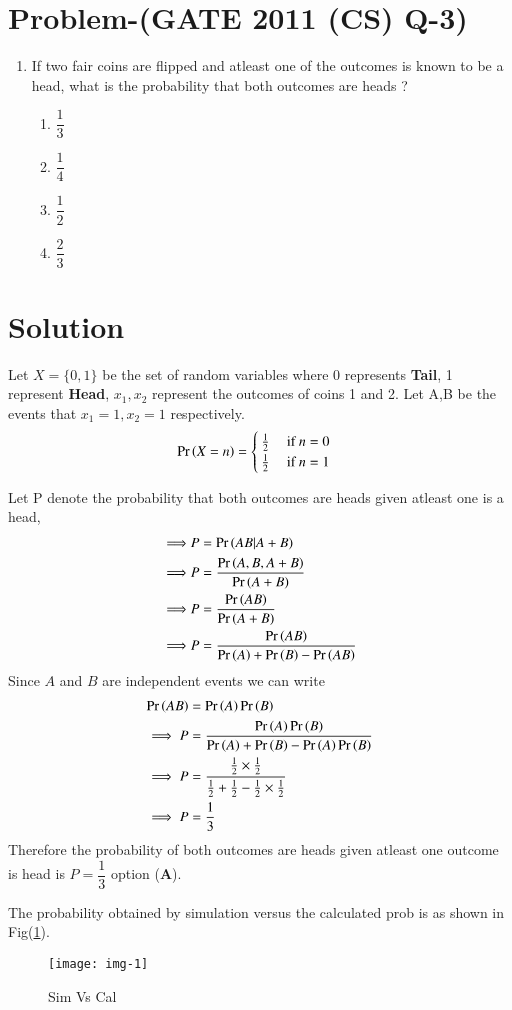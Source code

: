 \documentclass[journal,12pt,twocolumn]{IEEEtran}
\begin{document}
\section*{Problem-(GATE 2011 (CS) Q-3)}
\begin{enumerate}
\item If two fair coins are flipped and atleast one of the outcomes is known to be a head, what is the probability that both outcomes are heads ?
	\begin{enumerate}
	\item $\dfrac{1}{3}$\\
	\item $\dfrac{1}{4}$\\
	\item $\dfrac{1}{2}$\\
	\item $\dfrac{2}{3}$
	
	\end{enumerate}
\end{enumerate}

\section*{Solution}

Let $X=\{0,1\}$ be the set of random variables where 0 represents \textbf{Tail}, 1 represent \textbf{Head}, $x_1,x_2$ represent the outcomes of coins 1 and 2. Let A,B be the events that $x_1=1,x_2=1$ respectively.
\begin{align}
& \Pr\left(X=n\right)= \begin{cases}
\frac{1}{2} & \text{ if } n=0\\
\frac{1}{2}  & \text{ if } n=1
\end{cases}
\end{align}

Let P denote the probability that both outcomes are heads given atleast one is a head,
\begin{align}
\implies & P=\Pr\left(AB|A+B\right)\\
\implies & P=\dfrac{\Pr\left(A,B,A+B\right)}{\Pr\left(A+B\right)}\\
\implies & P=\dfrac{\Pr\left(AB\right)}{\Pr\left(A+B\right)}\\
\implies & P=\dfrac{\Pr\left(AB\right)}{\Pr\left(A\right)+\Pr\left(B\right)-\Pr\left(AB\right)}
\end{align}
Since $A$ and $B$ are independent events we can write
\begin{align}
 \Pr\left(AB\right)&=\Pr\left(A\right)\Pr\left(B\right)\\
 \implies P&=\dfrac{\Pr\left(A\right)\Pr\left(B\right)}{\Pr\left(A\right)+\Pr\left(B\right)-\Pr\left(A\right)\Pr\left(B\right)}\\
\implies P&= \dfrac{\frac{1}{2}\times \frac{1}{2}}{\frac{1}{2}+\frac{1}{2}-\frac{1}{2}\times \frac{1}{2}}\\
\implies P&=\dfrac{1}{3}
\end{align}
Therefore the probability of both outcomes are heads given atleast one outcome is head is $P=\dfrac{1}{3}$ option (\textbf{A}).

The probability obtained by simulation versus the calculated prob is as shown in Fig(\ref{fig_0}).
\begin{figure}[h]
    \centering
    \texttt{[image: img-1]}
    \caption{Sim Vs Cal}
    \label{fig_0}
\end{figure}
\end{document}
